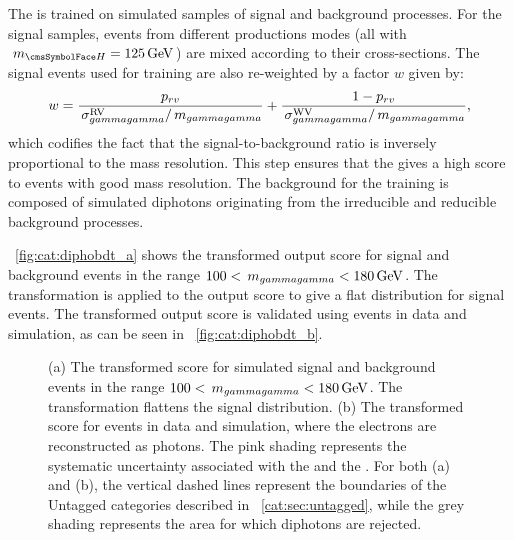 The \DiPhoBdt is trained on simulated samples of signal and background processes. For the signal samples, events from different productions modes (all with $\mH=125\GeV$) are mixed according to their cross-sections. The signal events used for training are also re-weighted by a factor $w$ given by: 
\begin{equation}
w= \frac{p_{rv}}{\,\sigma^\text{RV}_{gammagamma}/\,m_{gammagamma}}+\frac{1-p_{rv}}{\,\sigma^\text{WV}_{gammagamma}/\,m_{gammagamma}},
\end{equation} 
which codifies the fact that the signal-to-background ratio is inversely proportional to the mass resolution. This step ensures that the \DiPhoBdt gives a high score to events with good mass resolution.
The background for the training is composed of simulated diphotons originating from the irreducible and reducible \SM background processes. 

\Fig~\ref{fig:cat:diphobdt_a} shows the transformed \DiPhoBdt output score for signal and background events in the range $100 < \,m_{gammagamma} < 180\,\text{Ge\hspace{-.08em}V}$. The transformation is applied to the \DiPhoBdt output score to give a flat distribution for signal events. The transformed \DiPhoBdt output score is validated using \Zee events in data and simulation, as can be seen in \Fig~\ref{fig:cat:diphobdt_b}.
\begin{figure}[h]
\centering
\caption{ (a) The transformed \DiPhoBdt score for simulated signal and background events in the range $100 < \,m_{gammagamma} < 180\,\text{Ge\hspace{-.08em}V}$. The transformation flattens the signal distribution. (b) The transformed \DiPhoBdt score for \Zee events in data and simulation, where the electrons are reconstructed as photons. The pink shading represents the systematic uncertainty associated with the \PhoIdBdt and the \PhoEnergyBdt. For both (a) and (b), the vertical dashed lines represent the boundaries of the Untagged categories described in \Sec~\ref{cat:sec:untagged}, while the grey shading represents the area for which diphotons are rejected.}
\label{fig:cat:diphobdt}
\end{figure}

